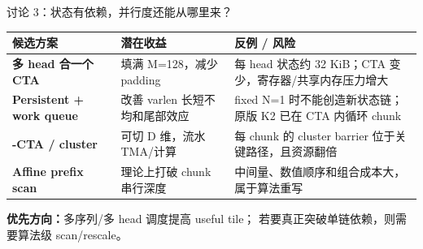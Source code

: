 \documentclass[aspectratio=169,10pt]{beamer}
\newcommand{\key}[1]{\textcolor{KdaBlue}{\ifmmode\boldsymbol{#1}\else\textbf{#1}\fi}}
\begin{document}
\begin{frame}{讨论 3：状态有依赖，并行度还能从哪里来？}
  \small
  \begin{tabular}{>{\bfseries}p{}p{}p{}}
    \toprule
    候选方案 & 潜在收益 & 反例 / 风险 \\
    \midrule
    多 head 合一个 CTA
      & 填满 M=128，减少 padding
      & 每 head 状态约 32 KiB；CTA 变少，寄存器/共享内存压力增大 \\
    \addlinespace
    Persistent + work queue
      & 改善 varlen 长短不均和尾部效应
      & fixed N=1 时不能创造新状态链；原版 K2 已在 CTA 内循环 chunk \\
    \addlinespace
    2-CTA / cluster
      & 可切 D 维，流水 TMA/计算
      & 每 chunk 的 cluster barrier 位于关键路径，且资源翻倍 \\
    \addlinespace
    Affine prefix scan
      & 理论上打破 chunk 串行深度
      & 中间量、数值顺序和组合成本大，属于算法重写 \\
    \bottomrule
  \end{tabular}

  \vspace{0.6em}
  \centering
  \key{优先方向：}多序列/多 head 调度提高 useful tile；
  若要真正突破单链依赖，则需要算法级 scan/rescale。

\end{frame}
\end{document}

